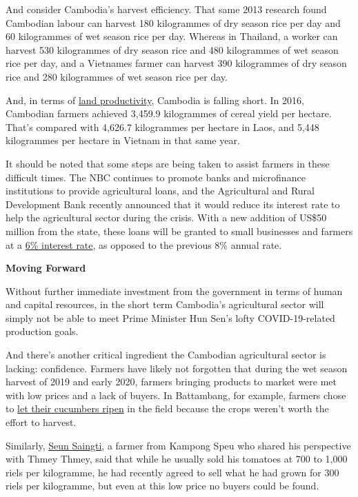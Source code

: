 \documentclass[10pt,a4paper]{letter}
\begin{document}
And consider Cambodia's harvest efficiency. That same 2013 research found Cambodian labour can harvest 180 kilogrammes of dry season rice per day and 60 kilogrammes of wet season rice per day. Whereas in Thailand, a worker can harvest 530 kilogrammes of dry season rice and 480 kilogrammes of wet season rice per day, and a Vietnames farmer can harvest 390 kilogrammes of dry season rice and 280 kilogrammes of wet season rice per day.

And, in terms of \href{https://databank.worldbank.org/source/world-development-indicators}{land productivity}, Cambodia is falling short. In 2016, Cambodian farmers achieved 3,459.9 kilogrammes of cereal yield per hectare. That's compared with 4,626.7 kilogrammes per hectare in Laos, and 5,448 kilogrammes per hectare in Vietnam in that same year.

It should be noted that some steps are being taken to assist farmers in these difficult times. The NBC continues to promote
banks and microfinance institutions to provide agricultural loans, and the Agricultural and Rural Development Bank recently announced that it would reduce its interest rate to help the agricultural sector during the crisis. With a new addition of US\$50 million from the state, these loans will be granted to small businesses and farmers at a \href{https://www.khmertimeskh.com/50716279/govt-disburses-50-million-through-agricultural-and-rural-development-bank/}{6\% interest rate}, as opposed to the previous 8\% annual rate.

\textbf{Moving Forward}

Without further immediate investment from the government in terms of human and capital resources, in the short term Cambodia's agricultural sector will simply not be able to meet Prime Minister Hun Sen's lofty COVID-19-related production goals.

And there's another critical ingredient the Cambodian agricultural sector is lacking: confidence. Farmers have likely not forgotten that during the wet season harvest of 2019 and early 2020, farmers bringing products to market were met with low prices and a lack of buyers. In Battambang, for example, farmers chose to \href{https://www.rfa.org/khmer/news/economy/cucumber-low-price-11292019053445.html}{let their cucumbers ripen} in the field because the crops weren't worth the effort to harvest.

Similarly, \href{https://thmeythmey.com/?page=detail&id=87328&fbclid=IwAR108Ssr16tcJVz79AFr1bcIQTd4xfkgzQpOwa2kKHdghVxRlWyxfqrncLg}{Seun Saingti}, a farmer from Kampong Speu who shared his perspective with Thmey Thmey, said that while he usually sold his tomatoes at 700 to 1,000 riels per kilogramme, he had recently agreed to sell what he had grown for 300 riels per kilogramme, but even at this low price no buyers could be found.
\end{document}
